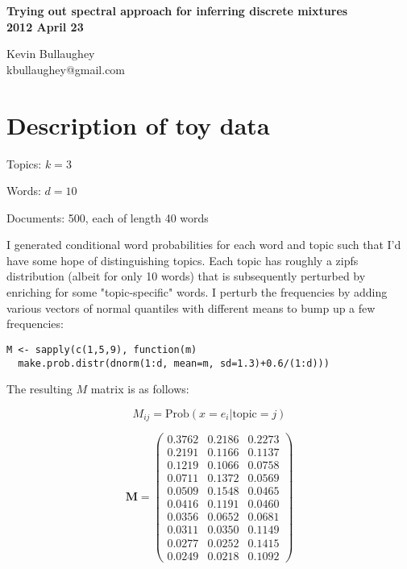 \documentclass[10pt]{article}
\date{}
\begin{document}
\begin{center}
{\Large
\textbf{Trying out spectral approach for inferring discrete mixtures}
}\\
\vspace{0.3cm}
\large{\textbf{2012 April 23}}

Kevin Bullaughey\\
kbullaughey@gmail.com
\end{center}

\setlength{\parskip}{8pt}
\setlength{\parindent}{1cm}

\section{Description of toy data}

\noindent Topics: $k=3$

\noindent Words: $d=10$

\noindent Documents: 500, each of length 40 words

I generated conditional word probabilities for each word and topic such that I'd have some hope of distinguishing topics. Each topic has roughly a zipfs distribution (albeit for only 10 words) that is subsequently perturbed by enriching for some "topic-specific" words. I perturb the frequencies by adding various vectors of normal quantiles with different means to bump up a few frequencies:

\begin{verbatim}
M <- sapply(c(1,5,9), function(m)
  make.prob.distr(dnorm(1:d, mean=m, sd=1.3)+0.6/(1:d)))
\end{verbatim}

The resulting $M$ matrix is as follows:

\begin{displaymath}
M_{ij} = \mathrm{Prob}(x=e_i|\mathrm{topic}=j)
\end{displaymath}

\begin{displaymath}
\mathbf{M} = 
\left( \begin{array}{ccc} 
0.3762 & 0.2186 & 0.2273 \\
0.2191 & 0.1166 & 0.1137 \\
0.1219 & 0.1066 & 0.0758 \\
0.0711 & 0.1372 & 0.0569 \\
0.0509 & 0.1548 & 0.0465 \\
0.0416 & 0.1191 & 0.0460 \\
0.0356 & 0.0652 & 0.0681 \\
0.0311 & 0.0350 & 0.1149 \\
0.0277 & 0.0252 & 0.1415 \\
0.0249 & 0.0218 & 0.1092
\end{array} \right)
\end{displaymath}
\end{document}
